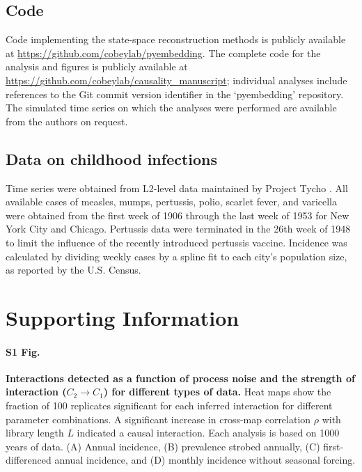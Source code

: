 \documentclass[10pt,letterpaper]{article}
\begin{document}
\subsection*{Code}
Code implementing the state-space reconstruction methods is publicly available at \url{https://github.com/cobeylab/pyembedding}.
The complete code for the analysis and figures is publicly available at \url{https://github.com/cobeylab/causality_manuscript}; individual analyses include references to the Git commit version identifier in the `pyembedding' repository.
The simulated time series on which the analyses were performed are available from the authors on request.

\subsection*{Data on childhood infections}
Time series were obtained from L2-level data maintained by Project Tycho \cite{vanPanhuis2013}.
All available cases of measles, mumps, pertussis, polio, scarlet fever, and varicella were obtained from the first week of 1906 through the last week of 1953 for New York City and Chicago.
Pertussis data were terminated in the 26th week of 1948 to limit the influence of the recently introduced pertussis vaccine.
Incidence was calculated by dividing weekly cases by a spline fit to each city's population size, as reported by the U.S. Census.

\section*{Supporting Information}

\paragraph*{S1 Fig.}
\label{fig:detect_diffdata}
{\bf Interactions detected as a function of process noise and the strength of interaction ($C_2 \rightarrow C_1$) for different types of data.}
Heat maps show the fraction of 100 replicates significant for each inferred interaction for different parameter combinations.
A significant increase in cross-map correlation $\rho$ with library length $L$ indicated a causal interaction.
Each analysis is based on 1000 years of data.
(A) Annual incidence, (B) prevalence strobed annually, (C) first-differenced annual incidence, and (D) monthly incidence without seasonal forcing.
\end{document}
